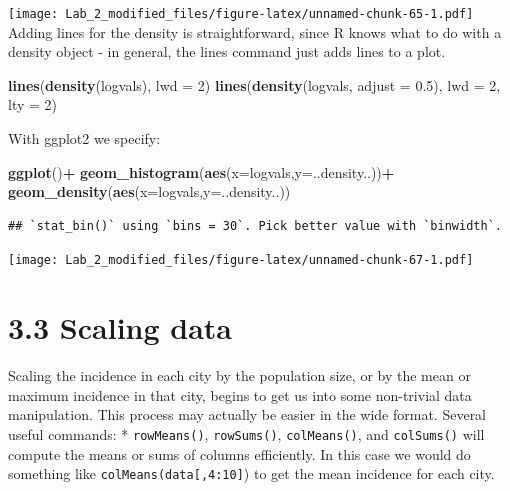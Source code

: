 \documentclass[11pt,]{article}
\newenvironment{Shaded}{\begin{snugshade}}{\end{snugshade}}
\newcommand{\KeywordTok}[1]{\textcolor[rgb]{0.13,0.29,0.53}{\textbf{#1}}}
\newcommand{\DataTypeTok}[1]{\textcolor[rgb]{0.13,0.29,0.53}{#1}}
\newcommand{\DecValTok}[1]{\textcolor[rgb]{0.00,0.00,0.81}{#1}}
\newcommand{\FloatTok}[1]{\textcolor[rgb]{0.00,0.00,0.81}{#1}}
\newcommand{\StringTok}[1]{\textcolor[rgb]{0.31,0.60,0.02}{#1}}
\newcommand{\OperatorTok}[1]{\textcolor[rgb]{0.81,0.36,0.00}{\textbf{#1}}}
\newcommand{\NormalTok}[1]{#1}
\begin{document}
\texttt{[image: Lab\_2\_modified\_files/figure-latex/unnamed-chunk-65-1.pdf]}
Adding lines for the density is straightforward, since R knows what to
do with a density object - in general, the lines command just adds lines
to a plot.

\begin{Shaded}
\begin{Highlighting}[]
\KeywordTok{lines}\NormalTok{(}\KeywordTok{density}\NormalTok{(logvals), }\DataTypeTok{lwd =} \DecValTok{2}\NormalTok{)}
\KeywordTok{lines}\NormalTok{(}\KeywordTok{density}\NormalTok{(logvals, }\DataTypeTok{adjust =} \FloatTok{0.5}\NormalTok{), }\DataTypeTok{lwd =} \DecValTok{2}\NormalTok{, }\DataTypeTok{lty =} \DecValTok{2}\NormalTok{)}
\end{Highlighting}
\end{Shaded}

With ggplot2 we specify:

\begin{Shaded}
\begin{Highlighting}[]
\KeywordTok{ggplot}\NormalTok{()}\OperatorTok{+}
\StringTok{  }\KeywordTok{geom_histogram}\NormalTok{(}\KeywordTok{aes}\NormalTok{(}\DataTypeTok{x=}\NormalTok{logvals,}\DataTypeTok{y=}\NormalTok{..density..))}\OperatorTok{+}
\StringTok{  }\KeywordTok{geom_density}\NormalTok{(}\KeywordTok{aes}\NormalTok{(}\DataTypeTok{x=}\NormalTok{logvals,}\DataTypeTok{y=}\NormalTok{..density..))}
\end{Highlighting}
\end{Shaded}

\begin{verbatim}
## `stat_bin()` using `bins = 30`. Pick better value with `binwidth`.
\end{verbatim}

\texttt{[image: Lab\_2\_modified\_files/figure-latex/unnamed-chunk-67-1.pdf]}

\section{3.3 Scaling data}\label{scaling-data}

Scaling the incidence in each city by the population size, or by the
mean or maximum incidence in that city, begins to get us into some
non-trivial data manipulation. This process may actually be easier in
the wide format. Several useful commands: * \texttt{rowMeans()},
\texttt{rowSums()}, \texttt{colMeans()}, and \texttt{colSums()} will
compute the means or sums of columns efficiently. In this case we would
do something like \texttt{colMeans(data{[},4:10{]}}) to get the mean
incidence for each city.
\end{document}
